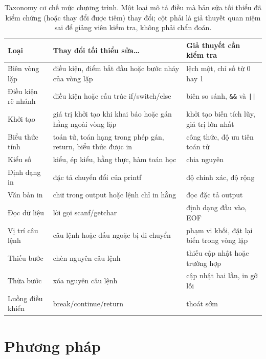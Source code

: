 \documentclass[a4paper,preprint,12pt,authoryear]{elsarticle}
\begin{document}
\begin{table}[t]
\centering
\caption{Taxonomy cơ chế mức chương trình. Một loại mô tả điều mà bản sửa tối thiểu đã kiểm chứng (hoặc thay đổi được tiêm) thay đổi; cột phải là giả thuyết quan niệm sai để giảng viên kiểm tra, không phải chẩn đoán.}\label{tab:taxonomy}
\small
\begin{tabular}{p{2.9cm}p{4.9cm}p{4.6cm}}
\toprule
Loại & Thay đổi tối thiểu sửa\dots & Giả thuyết cần kiểm tra \\
\midrule
Biên vòng lặp & điều kiện, điểm bắt đầu hoặc bước nhảy của vòng lặp & lệch một, chỉ số từ 0 hay 1 \\
Điều kiện rẽ nhánh & điều kiện hoặc cấu trúc if/switch/else & biên so sánh, \texttt{\&\&} và \texttt{||} \\
Khởi tạo & giá trị khởi tạo khi khai báo hoặc gán hằng ngoài vòng lặp & khởi tạo biến tích lũy, giá trị lớn nhất \\
Biểu thức tính & toán tử, toán hạng trong phép gán, return, biểu thức được in & công thức, độ ưu tiên toán tử \\
Kiểu số & kiểu, ép kiểu, hằng thực, hàm toán học & chia nguyên \\
Định dạng in & đặc tả chuyển đổi của printf & độ chính xác, độ rộng \\
Văn bản in & chữ trong output hoặc lệnh chỉ in hằng & đọc đặc tả output \\
Đọc dữ liệu & lời gọi scanf/getchar & định dạng đầu vào, EOF \\
Vị trí câu lệnh & câu lệnh hoặc dấu ngoặc bị di chuyển & phạm vi khối, đặt lại biến trong vòng lặp \\
Thiếu bước & chèn nguyên câu lệnh & thiếu cập nhật hoặc trường hợp \\
Thừa bước & xóa nguyên câu lệnh & cập nhật hai lần, in gỡ lỗi \\
Luồng điều khiển & break/continue/return & thoát sớm \\
\bottomrule
\end{tabular}
\end{table}

\section{Phương pháp}\label{sec:methods}
\end{document}
